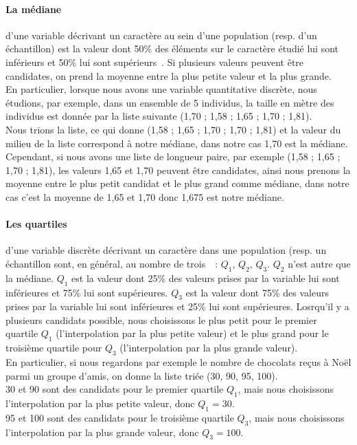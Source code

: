 \documentclass[12pt]{article}
\begin{document}
\paragraph{La médiane} d'une variable décrivant un caractère au sein d'une population (resp. d'un échantillon) est la valeur dont 50\% des éléments sur le caractère étudié lui sont inférieurs et 50\% lui sont supérieurs~\cite{stats}. Si plusieurs valeurs peuvent être candidates, on prend la moyenne entre la plus petite valeur et la plus grande.\\
En particulier, lorsque nous avons une variable quantitative discrète, nous étudions, par exemple, dans un ensemble de 5 individus, la taille en mètre des individus est donnée par la liste suivante (1,70 ; 1,58 ; 1,65 ; 1,70 ; 1,81).\\
Nous trions la liste, ce qui donne (1,58 ; 1,65 ; 1,70 ; 1,70 ; 1,81) et la valeur du milieu de la liste correspond à notre médiane, dans notre cas 1,70 est la médiane.\\
Cependant, si nous avons une liste de longueur paire, par exemple (1,58 ; 1,65 ; 1,70 ; 1,81), les valeurs 1,65 et 1,70 peuvent être candidates, ainsi nous prenons la moyenne entre le plus petit candidat et le plus grand comme médiane, dans notre cas c'est la moyenne de 1,65 et 1,70 donc 1,675 est notre médiane.

\paragraph{Les quartiles} d'une variable discrète décrivant un caractère dans une population (resp. un échantillon sont, en général, au nombre de trois~\cite{quart}~: $Q_1$, $Q_2$, $Q_3$. $Q_2$ n'est autre que la médiane. $Q_1$ est la valeur dont 25\% des valeurs prises par la variable lui sont inférieures et 75\% lui sont supérieures. $Q_3$ est la valeur dont 75\% des valeurs prises par la variable lui sont inférieures et 25\% lui sont supérieures. Losrqu'il y a plusieurs candidats possible, nous choisissons le plus petit pour le premier quartile $Q_1$ (l'interpolation par la plus petite valeur) et le plus grand pour le troisième quartile pour $Q_3$ (l'interpolation par la plus grande valeur).\\
En particulier, si nous regardons par exemple le nombre de chocolats reçus à Noël parmi un groupe d'amis, on donne la liste triée (30, 90, 95, 100).\\
30 et 90 sont des candidats pour le premier quartile $Q_1$, mais nous choisissons l'interpolation par la plus petite valeur, donc $Q_1 = 30$.\\
95 et 100 sont des candidats pour le troisième quartile $Q_3$, mais nous choisissons l'interpolation par la plus grande valeur, donc $Q_3 = 100$.\\
\end{document}
